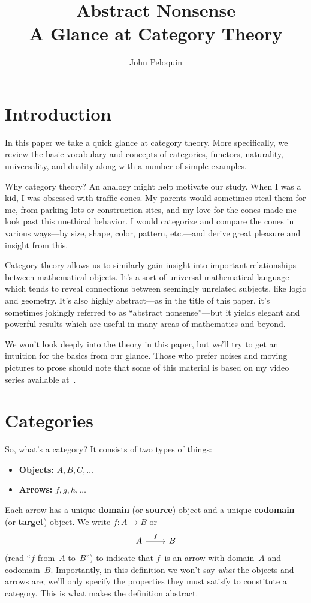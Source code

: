 \documentclass[letterpaper,12pt]{article}
\title{Abstract Nonsense\\{\smaller A Glance at Category Theory}}
\author{John Peloquin}
\newcommand{\textdefn}{\textbf}
\theoremstyle{definition}
\theoremstyle{plain}
\numberwithin{equation}{section}
\begin{document}
\maketitle

\section*{Introduction}
In this paper we take a quick glance at category theory. More specifically, we review the basic vocabulary and concepts of categories, functors, naturality, universality, and duality along with a number of simple examples.

Why category theory? An analogy might help motivate our study. When I was a kid, I was obsessed with traffic cones. My parents would sometimes steal them for me, from parking lots or construction sites, and my love for the cones made me look past this unethical behavior. I would categorize and compare the cones in various ways---by size, shape, color, pattern, etc.---and derive great pleasure and insight from this.

Category theory allows us to similarly gain insight into important relationships between mathematical objects. It's a sort of universal mathematical language which tends to reveal connections between seemingly unrelated subjects, like logic and geometry. It's also highly abstract---as in the title of this paper, it's sometimes jokingly referred to as ``abstract nonsense''---but it yields elegant and powerful results which are useful in many areas of mathematics and beyond.

We won't look deeply into the theory in this paper, but we'll try to get an intuition for the basics from our glance. Those who prefer noises and moving pictures to prose should note that some of this material is based on my video series available at~\cite{peloquin}.

\section{Categories}
So, what's a category? It consists of two types of things:
\begin{itemize}
\item \textdefn{Objects:} \(A,B,C,\ldots\)
\item \textdefn{Arrows:} \(f,g,h,\ldots\)
\end{itemize}
Each arrow has a unique \textdefn{domain} (or \textdefn{source}) object and a unique \textdefn{codomain} (or \textdefn{target}) object. We write \(f:A\to B\) or
\begin{equation*}
\begin{tikzcd}
A \ar[r,"f"] & B
\end{tikzcd}
\end{equation*}
(read ``\(f\) from~\(A\) to~\(B\)'') to indicate that \(f\)~is an arrow with domain~\(A\) and codomain~\(B\). Importantly, in this definition we won't say \emph{what} the objects and arrows are; we'll only specify the properties they must satisfy to constitute a category. This is what makes the definition abstract.
\end{document}
